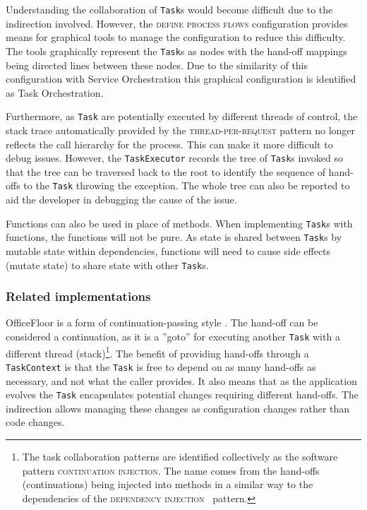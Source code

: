 \documentclass[prodmode]{style/acmlarge}
\begin{document}
Understanding the collaboration of \texttt{Task}s would become difficult due to
the indirection involved.  However, the \textsc{define process flows}
configuration provides means for graphical tools to manage the configuration to
reduce this difficulty.  The tools graphically represent the \texttt{Task}s as
nodes with the hand-off mappings being directed lines between these nodes.  Due
to the similarity of this configuration with Service Orchestration this
graphical configuration is identified as Task Orchestration.

Furthermore, as \texttt{Task} are potentially executed by different threads of
control, the stack trace automatically provided by the
\textsc{thread-per-request} pattern no longer reflects the call hierarchy for
the process.  This can make it more difficult to debug issues.  However, the
\texttt{TaskExecutor} records the tree of \texttt{Task}s invoked so that the
tree can be traversed back to the root to identify the sequence of hand-offs to
the \texttt{Task} throwing the exception.  The whole tree can also be reported
to aid the developer in debugging the cause of the issue.

Functions can also be used in place of methods.  When implementing
\texttt{Task}s with functions, the functions will not be pure.  As state is
shared between \texttt{Task}s by mutable state within dependencies, functions
will need to cause side effects (mutate state) to share state with other
\texttt{Task}s.



\subsubsection*{Related implementations}

OfficeFloor is a form of continuation-passing style \cite{continuations}.
The hand-off can be considered a continuation, as it is a ''goto'' for executing
another \texttt{Task} with a different thread (stack)\footnote{The task
collaboration patterns are identified collectively as the software pattern
\textsc{continuation injection}.  The name comes from the hand-offs
(continuations) being injected into methods in a similar way to the dependencies
of the \textsc{dependency injection}~\cite{ioc} pattern.}.  The benefit of
providing hand-offs through a \texttt{TaskContext} is that the \texttt{Task} is
free to depend on as many hand-offs as necessary, and not what the caller
provides.  It also means that as the application evolves the \texttt{Task}
encapsulates potential changes requiring different hand-offs.  The indirection
allows managing these changes as configuration changes rather than code changes.
\end{document}
